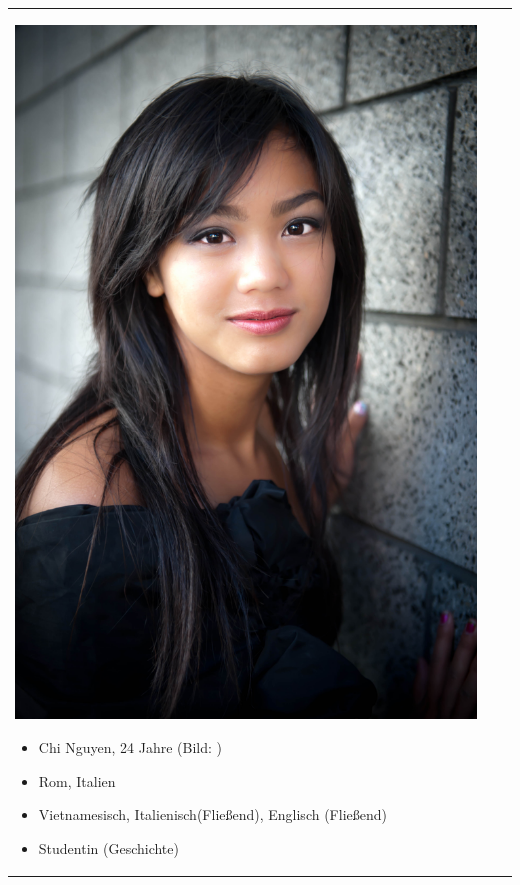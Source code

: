 \begin{center}
	\begin{tabular}{| p{} | p{} | p{} |}	
		\hline
		\vspace{0.3mm}
		\begin{minipage}{.2\textwidth}
			\includegraphics[width=\linewidth]{../pictures/persona3.jpg}
		\end{minipage}
		\begin{itemize}
			\item Chi Nguyen, 24 Jahre (Bild: \cite{persona3})
			\item Rom, Italien
			\item Vietnamesisch, Italienisch(Fließend), Englisch (Fließend)
			\item Studentin (Geschichte)

\end{itemize}
\end{tabular}
\end{center}
